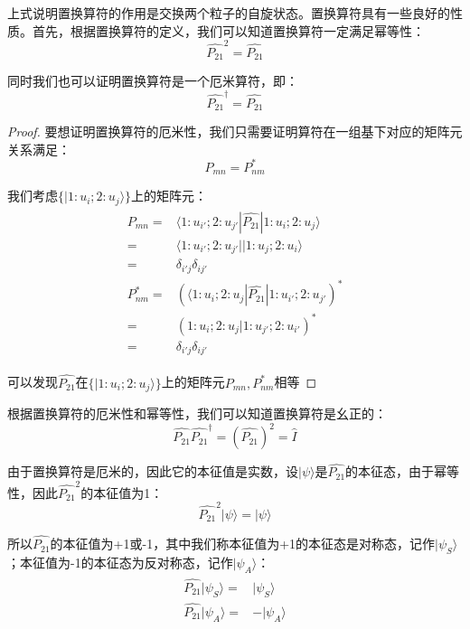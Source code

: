     上式说明置换算符的作用是交换两个粒子的自旋状态。置换算符具有一些良好的性质。首先，根据置换算符的定义，我们可以知道置换算符一定满足幂等性：
    \begin{equation}
        \hat{P_{21}}^2=\hat{P_{21}}
    \end{equation}
    
    同时我们也可以证明置换算符是一个厄米算符，即：
    \begin{equation}
        \hat{P_{21}}^\dagger=\hat{P_{21}}
    \end{equation}
\begin{proof}
    要想证明置换算符的厄米性，我们只需要证明算符在一组基下对应的矩阵元关系满足：
    \begin{equation}
        P_{mn}=P_{nm}^*
    \end{equation}
    
    我们考虑$\{|1:u_i;2:u_j\rangle\}$上的矩阵元：
    \begin{align}
        \begin{split}
            P_{mn}=&\langle 1:u_{i'};2:u_{j'}|\hat{P_{21}}|1:u_i;2:u_j\rangle\\
            =&\langle 1:u_{i'};2:u_{j'}||1:u_j;2:u_i\rangle\\
            =& \delta_{i'j}\delta_{ij'}\\
            P_{nm}^*=&(\langle 1:u_i;2:u_j|\hat{P_{21}}|1:u_{i'};2:u_{j'})^*\\
            =&(1:u_i;2:u_j|1:u_{j'};2:u_{i'})^*\\
            =&\delta_{i'j}\delta_{ij'}
        \end{split}
    \end{align}
    
    可以发现$\hat{P_{21}}$在$\{|1:u_i;2:u_j\rangle\}$上的矩阵元$P_{mn},P_{nm}^*$相等
\end{proof}

    根据置换算符的厄米性和幂等性，我们可以知道置换算符是幺正的：
    \begin{equation}
       \hat{P_{21}}\hat{P_{21}}^\dagger =(\hat{P_{21}})^2=\hat{I}
    \end{equation}
    
    由于置换算符是厄米的，因此它的本征值是实数，设$|\psi\rangle$是$\hat{P_{21}}$的本征态，由于幂等性，因此$\hat{P_{21}}^2$的本征值为1：
    \begin{equation}
        \hat{P_{21}}^2|\psi\rangle=|\psi\rangle
    \end{equation}
    
    所以$\hat{P_{21}}$的本征值为+1或-1，其中我们称本征值为+1的本征态是对称态，记作$|\psi_S\rangle$；本征值为-1的本征态为反对称态，记作$|\psi_A\rangle$：
    \begin{align}
        \begin{split}
            \hat{P_{21}}|\psi_S\rangle=&|\psi_S\rangle\\
             \hat{P_{21}}|\psi_A\rangle=&-|\psi_A\rangle
        \end{split}
    \end{align}
    
